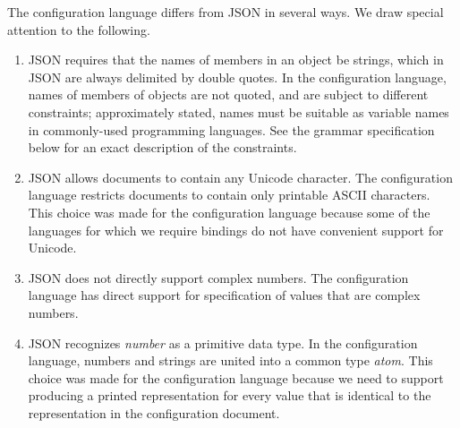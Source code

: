 \documentclass{memarticle}
\begin{document}
The configuration language differs from JSON in several ways.
We draw special attention to the following.
\begin{enumerate}

\item JSON requires that the names of members in an object be strings,
which in JSON are always delimited by double quotes.
In the configuration language,
names of members of objects are not quoted,
and are subject to different constraints;
approximately stated,
names must be suitable as variable names
in commonly-used programming languages.
See the grammar specification below
for an exact description of the constraints.

\item JSON allows documents to contain any Unicode character.
The configuration language restricts documents 
to contain only printable ASCII characters.
This choice was made for the configuration language
because some of the languages for which we require bindings
do not have convenient support for Unicode.

\item JSON does not directly support complex numbers.
The configuration language has direct support 
for specification of values
that are complex numbers.

\item JSON recognizes \emph{number} as a primitive data type.
In the configuration language,
numbers and strings are united into a common type \emph{atom}.
This choice was made for the configuration language
because we need to support producing a printed representation
for every value
that is identical to the representation in the configuration document.
\end{enumerate}


\printindex
\end{document}

